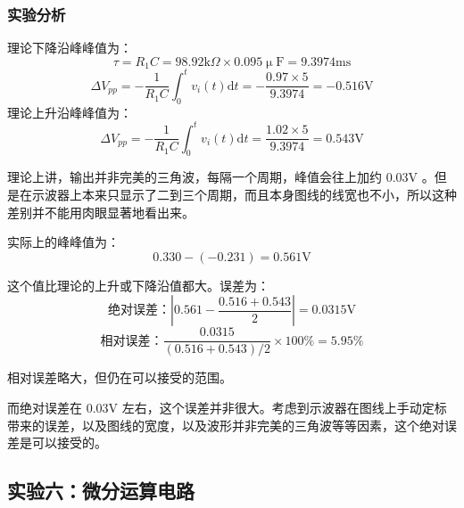\documentclass[a4paper,11pt,UTF8]{ctexart}
\newcommand\mr[1]{\mathrm{#1}}
\newcommand\dd{\mathrm{d}}
\begin{document}
\subsubsection{实验分析}
理论下降沿峰峰值为：
\[ \tau=R_1C=98.92\mr{k}\Omega\times 0.095\mr{\upmu F}
 =9.3974\mr{ms} \]
\[ \Delta V_{pp}=-\frac{1}{R_1C}\int_0^tv_i(t)\dd{t}
 = -\frac{0.97\times 5}{9.3974}=-0.516\mr{V} \]
理论上升沿峰峰值为：
\[ \Delta V_{pp}=-\frac{1}{R_1C}\int_0^tv_i(t)\dd{t}
 = \frac{1.02\times 5}{9.3974}=0.543\mr{V} \]
\par 理论上讲，输出并非完美的三角波，每隔一个周期，峰值会往上加约 0.03V 。但是在示波器上本来只显示了二到三个周期，而且本身图线的线宽也不小，所以这种差别并不能用肉眼显著地看出来。
\par 实际上的峰峰值为：
\[ 0.330-(-0.231)=0.561\mr{V} \]
\par 这个值比理论的上升或下降沿值都大。误差为：
\[ \text{绝对误差：}|0.561-\frac{0.516+0.543}{2}|=0.0315\mr{V} \]
\[ \text{相对误差：}\frac{0.0315}{(0.516+0.543)/2}\times100\%  =5.95\% \]
\par 相对误差略大，但仍在可以接受的范围。
\par 而绝对误差在 0.03V 左右，这个误差并非很大。考虑到示波器在图线上手动定标带来的误差，以及图线的宽度，以及波形并非完美的三角波等等因素，这个绝对误差是可以接受的。

\subsection{实验六：微分运算电路}
\end{document}
